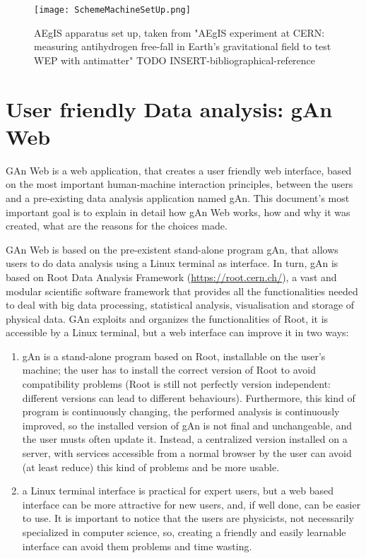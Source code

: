 \begin{figure}[H]
\centering
\texttt{[image: SchemeMachineSetUp.png]} 
\caption{AEgIS apparatus set up, taken from "AEgIS experiment at CERN: measuring antihydrogen free-fall in Earth’s gravitational field to test WEP with antimatter" TODO INSERT-bibliographical-reference}
\end{figure}

\section{User friendly Data analysis: gAn Web}

GAn Web is a web application, that creates a user friendly web interface, based on the most important human-machine interaction principles, between the users and a pre-existing data analysis application named gAn.
This document's most important goal is to explain in detail how gAn Web works, how and why it was created, what are the reasons for the choices made. 

GAn Web is based on the pre-existent stand-alone program gAn, that allows users to do data analysis using a Linux terminal as interface. In turn, gAn is based on Root Data Analysis Framework (\url{https://root.cern.ch/}), a vast and modular scientific software framework that provides all the functionalities needed to deal with big data processing, statistical analysis, visualisation and storage of physical data. GAn exploits and organizes the functionalities of Root, it is accessible by a Linux terminal, but a web interface can improve it in two ways:

\begin{enumerate}

\item gAn is a stand-alone program based on Root, installable on the user's machine; the user has to install the correct version of Root to avoid compatibility problems (Root is still not perfectly version independent: different versions can lead to different behaviours). Furthermore, this kind of program is continuously changing, the performed analysis is continuously improved, so the installed version of gAn is not final and unchangeable, and the user musts often update it. Instead, a centralized version installed on a server, with services accessible from a normal browser by the user can avoid (at least reduce) this kind of problems and be more usable.    
 

\item a Linux terminal interface is practical for expert users, but a web based interface can be more attractive for new users, and, if well done, can be easier to use. It is important to notice that the users are physicists, not necessarily specialized in computer science, so, creating a friendly and easily learnable interface can avoid them problems and time wasting.   


\end{enumerate}


